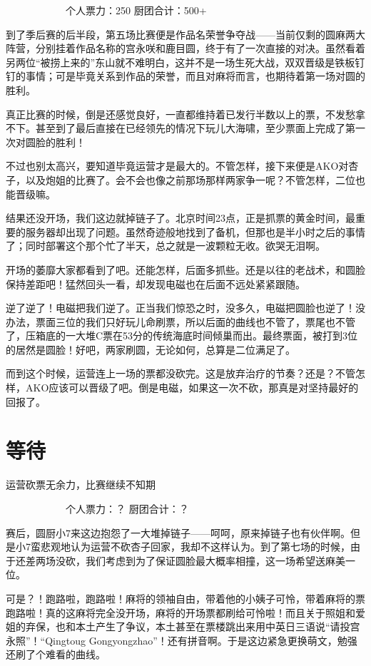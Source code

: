 　　　　　　个人票力：250 厨团合计：500+

到了季后赛的后半段，第五场比赛便是作品名荣誉争夺战——当前仅剩的圆麻两大阵营，分别挂着作品名称的宫永咲和鹿目圆，终于有了一次直接的对决。虽然看着另两位“被捞上来的”东山就不难明白，这并不是一场生死大战，双双晋级是铁板钉钉的事情；可是毕竟关系到作品的荣誉，而且对麻将而言，也期待着第一场对圆的胜利。

真正比赛的时候，倒是还感觉良好，一直都维持着已发行半数以上的票，不发愁拿不下。甚至到了最后直接在已经领先的情况下玩儿大海啸，至少票面上完成了第一次对圆脸的胜利！

不过也别太高兴，要知道毕竟运营才是最大的。不管怎样，接下来便是AKO对杏子，以及炮姐的比赛了。会不会也像之前那场那样两家争一呢？不管怎样，二位也能晋级嘛。

结果还没开场，我们这边就掉链子了。北京时间23点，正是抓票的黄金时间，最重要的服务器却出现了问题。虽然奇迹般地找到了备机，但那也是半小时之后的事情了；同时部署这个那个忙了半天，总之就是一波颗粒无收。欲哭无泪啊。

开场的萎靡大家都看到了吧。还能怎样，后面多抓些。还是以往的老战术，和圆脸保持差距吧！猛然回头一看，却发现电磁也在后面不远处紧紧跟随。

逆了逆了！电磁把我们逆了。正当我们惊恐之时，没多久，电磁把圆脸也逆了！没办法，票面三位的我们只好玩儿命刷票，所以后面的曲线也不管了，票尾也不管了，压箱底的一大堆C票在53分的传统海底时间倾巢而出。最终票面，被打到3位的居然是圆脸！好吧，两家刷圆，无论如何，总算是二位满足了。

而到这个时候，运营连上一场的票都没砍完。这是放弃治疗的节奏？还是？不管怎样，AKO应该可以晋级了吧。倒是电磁，如果这一次不砍，那真是对坚持最好的回报了。


\section{等待}
运营砍票无余力，比赛继续不知期

　　　　　　个人票力：？ 厨团合计：？

赛后，圆厨小7来这边抱怨了一大堆掉链子——呵呵，原来掉链子也有伙伴啊。但是小7蛮悲观地认为运营不砍杏子回家，我却不这样认为。到了第七场的时候，由于还差两场没砍，我们考虑到为了保证圆脸最大概率相撞，这一场希望送麻美一位。

可是？！跑路啦，跑路啦！麻将的领袖自由，带着他的小姨子可怜，带着麻将的票跑路啦！真的这麻将完全没开场，麻将的开场票都刷给可怜啦！而且关于照姐和爱姐的弃保，也和本土产生了争议，本土甚至在票楼跳出来用中英日三语说“请投宫永照”！“Qingtoug Gongyongzhao”！还有拼音啊。于是这边紧急更换萌文，勉强还刷了个难看的曲线。

